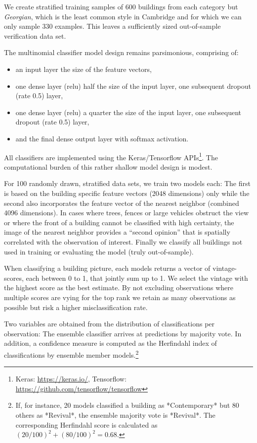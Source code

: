 \documentclass[]{article}
\let\rmarkdownfootnote\footnote%
\def\footnote{\protect\rmarkdownfootnote}
\begin{document}
We create stratified training samples of 600 buildings from each
category but \emph{Georgian}, which is the least common style in
Cambridge and for which we can only sample 330 examples. This leaves a
sufficiently sized out-of-sample verification data set.

The multinomial classifier model design remains parsimonious, comprising
of:

\begin{itemize}
\item
  an input layer the size of the feature vectors,
\item
  one dense layer (relu) half the size of the input layer, one
  subsequent dropout (rate 0.5) layer,
\item
  one dense layer (relu) a quarter the size of the input layer, one
  subsequent dropout (rate 0.5) layer,
\item
  and the final dense output layer with softmax activation.
\end{itemize}

All classifiers are implemented using the Keras/Tensorflow
APIs\footnote{Keras: \href{https://keras.io/}{https://keras.io/}, Tensorflow: \href{https://github.com/tensorflow/tensorflow}{https://github.com/tensorflow/tensorflow}}.
The computational burden of this rather shallow model design is modest.

For 100 randomly drawn, stratified data sets, we train two models each:
The first is based on the building specific feature vectors (2048
dimensions) only while the second also incorporates the feature vector
of the nearest neighbor (combined 4096 dimensions). In cases where
trees, fences or large vehicles obstruct the view or where the front of
a building cannot be classified with high certainty, the image of the
nearest neighbor provides a ``second opinion'' that is spatially
correlated with the observation of interest. Finally we classify all
buildings not used in training or evaluating the model (truly
out-of-sample).

When classifying a building picture, each models returns a vector of
vintage-scores, each between 0 to 1, that jointly sum up to 1. We select
the vintage with the highest score as the best estimate. By not
excluding observations where multiple scores are vying for the top rank
we retain as many observations as possible but risk a higher
misclassification rate.

Two variables are obtained from the distribution of classifications per
observation: The ensemble classifier arrives at predictions by majority
vote. In addition, a confidence measure is computed as the Herfindahl
index of classifications by ensemble member
models.\footnote{If, for instance, 20 models classified a building as *Contemporary* but 80 others as *Revival*, the ensemble majority vote is *Revival*. The corresponding Herfindahl score is calculated as $(20/100)^2 + (80/100)^2 = 0.68$.}
\end{document}

